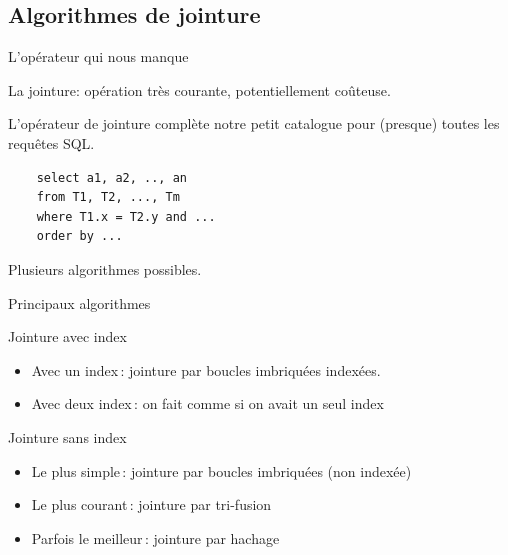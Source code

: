 
\subsection{Algorithmes de jointure}

\begin{frame}[fragile]{L'opérateur qui nous manque}

La jointure: opération très courante, potentiellement coûteuse.

\vfill

L'opérateur de jointure complète notre petit catalogue pour (presque) toutes 
les requêtes SQL.

\vfill

\begin{verbatim}
    select a1, a2, .., an
    from T1, T2, ..., Tm
    where T1.x = T2.y and ... 
    order by ...
\end{verbatim}

\vfill

Plusieurs algorithmes possibles.
\end{frame}

\begin{frame}{Principaux algorithmes}

\alert{Jointure avec index}

\begin{itemize}

  \item Avec un index\,: \alert{jointure par boucles imbriquées indexées}.
   
  \item  Avec deux index\,: on fait comme si on avait
            un seul index
\end{itemize}

\vfill

\alert{Jointure sans index}

\begin{itemize}

  \item Le plus simple\,: \alert{jointure
           par boucles imbriquées} (non indexée)

  \item Le plus courant\,: \alert{jointure par tri-fusion} 

   \item Parfois le meilleur\,: \alert{jointure par hachage}
\end{itemize}
\end{frame}

